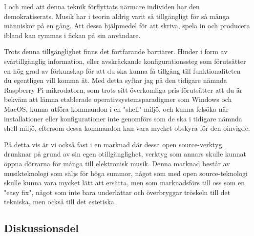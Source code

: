 \documentclass{article}
\begin{document}
  I och med att denna teknik förflyttats närmare individen har den demokratiserats. Musik har i teorin aldrig
  varit så tillgängligt för så många människor på en gång. Att dessa hjälpmedel för att skriva, spela in och
  producera ibland kan rymmas i fickan på sin användare. 

  Trots denna tillgänglighet finns det fortfarande barriärer. Hinder i form av svårtillgänglig information,
  eller avskräckande konfigurationssteg som förutsätter en hög grad av förkunskap för att du ska kunna få
  tillgång till funktionaliteten du egentligen vill komma åt. Med detta syftar jag på den tidigare nämnda
  Raspberry Pi-mikrodatorn, som trots sitt överkomliga pris förutsätter att du är bekväm att lämna etablerade
  operativsystemsparadigmer som Windows och MacOS, kunna utföra kommandon i en "shell"-miljö, och kunna
  felsöka när installationer eller konfigurationer inte genomförs som de ska i tidigare nämnda shell-miljö,
  eftersom dessa kommandon kan vara mycket obskyra för den oinvigde. 
	
  På detta vis är vi också fast i en marknad där dessa open source-verktyg drunknar på grund av sin egen
  otillgänglighet, verktyg som annars skulle kunnat öppna dörrarna för många till elektronisk musik. Denna
  marknad består av musikteknologi som säljs för höga summor, något som med open source-teknologi skulle kunna
  vara mycket lätt att ersätta, men som marknadsförs till oss som en "easy fix", något som inte bara
  underlättar och överbryggar tröskeln till det tekniska, men också till det estetiska. 


  
  





  

\subsection{Diskussionsdel}
\end{document}
